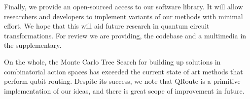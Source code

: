 Finally, we provide an open-sourced access to our software library. It will allow researchers and developers to implement variants of our methods with minimal effort. We hope that this will aid future research in quantum circuit transformations. For review we are providing, the codebase and a multimedia in the supplementary.  

On the whole, the Monte Carlo Tree Search for building up solutions in combinatorial action spaces has exceeded the current state of art methods that perform qubit routing. Despite its success, we note that QRoute is a primitive implementation of our ideas, and there is great scope of improvement in future. 
